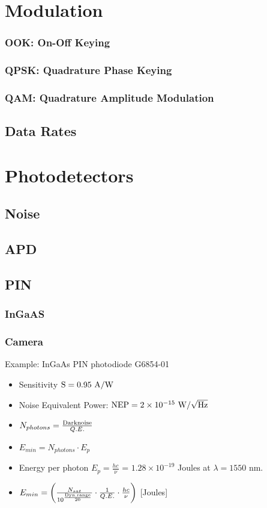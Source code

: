 \documentclass[a4paper]{article}
\begin{document}
\section{Modulation}
\subsubsection{OOK: On-Off Keying}
\subsubsection{QPSK: Quadrature Phase Keying}
\subsubsection{QAM: Quadrature Amplitude Modulation}
\subsection{Data Rates}

\section{Photodetectors}
\subsection{Noise}
\subsection{APD}
\subsection{PIN}
\subsubsection{InGaAS}
\pagebreak
\subsubsection{Camera}

Example: InGaAs PIN photodiode G6854-01

\begin{itemize}
\item Sensitivity $\rm S = 0.95 \ \rm A/\rm W$
\item Noise Equivalent Power: $\rm{NEP} = 2\times 10^{-15} \rm \ W/\sqrt{\rm{Hz}}$
\item $N_{photons} = \frac{\rm{Dark noise}}{Q.E.}$
\item $E_{min} = N_{photons} \cdot E_p$
\item Energy per photon $E_p=\frac{hc}{\nu}$ = $1.28\times 10^{-19}$ Joules at $\lambda=1550$ nm.
\item $E_{min} = \left(\frac{N_{sat}}{10^\frac{\rm{Dyn. range}}{20}}\cdot \frac{1}{Q.E.}\cdot\frac{hc}{\nu} \right)$ [Joules]
\end{itemize}
\end{document}
